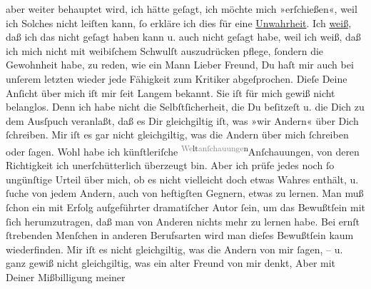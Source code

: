 \begin{ledgroupsized}[t]{13cm}
               aber weiter behauptet wird, ich hätte geſagt, ich möchte mich »erſchießen«, weil ich
               Solches nicht leiſten kann, ſo erkläre ich dies für eine \uline{Unwahrheit}. \strikeout{\textcolor{gray}{×}\-\textcolor{gray}{×}\-\textcolor{gray}{×}\-\textcolor{gray}{×}{ }\textcolor{gray}{Feſtſtellung dieſ}\textcolor{gray}{×}\-\textcolor{gray}{×}{ }\textcolor{gray}{×}\-\textcolor{gray}{×}\-\textcolor{gray}{×}\-\textcolor{gray}{×}\-\textcolor{gray}{×}\-\textcolor{gray}{×}\-\textcolor{gray}{×}} Ich \uline{weiß}, daß ich das nicht geſagt haben kann
               u. auch nicht geſagt habe, weil ich weiß, daß ich mich nicht mit weibiſchem Schwulſt
                  {\pb}auszudrücken pflege, ſondern die Gewohnheit
               habe, zu reden, wie ein Mann{\dotsseven}\pend
           \pstart
           Lieber Freund, Du haſt mir auch bei unſerem letzten \label{K_L03475-17v}\label{K_L03475-17h} wieder jede Fähigkeit zum Kritiker abgeſprochen. Dieſe Deine
               Anſicht über mich iſt mir ſeit Langem bekannt. Sie iſt für mich gewiß nicht
               belanglos. Denn ich habe nicht die Selbſtſicherheit, die Du beſitzeſt u. die Dich zu
               dem Ausſpuch veranlaßt, daß es {\pb}Dir gleichgiltig
               iſt, was  »wir Andern« über Dich ſchreiben. Mir
               iſt es gar nicht gleichgiltig, was die Andern über mich ſchreiben oder ſagen. Wohl
               habe ich künſtleriſche \substVorne{}\textsuperscript{\textcolor{gray}{We}lt\textcolor{gray}{anſchauunge}n}{\allowbreak}\substDazwischen{}Anſchauungen\substHinten{}, von deren Richtigkeit ich unerſchütterlich überzeugt bin. Aber ich prüfe
               jedes noch ſo ungünſtige Urteil über mich, ob es nicht vielleicht doch etwas Wahres
               enthält, u. ſuche von jedem Andern, auch von heftigſten Gegnern, etwas zu lernen. Man
               muß ſchon ein mit Erfolg aufgeführter dramatiſcher Autor ſein, {\pb}um das Bewußtſein mit ſich herumzutragen, daß
               man von Anderen nichts mehr zu lernen habe. Bei ernſt ſtrebenden Menſchen in anderen
               Berufsarten wird man dieſes Bewußtſein kaum wiederfinden.\pend
           \pstart
           Mir iſt es nicht gleichgiltig, was die Andern von mir ſagen, – u. ganz gewiß nicht
               gleichgiltig, was ein alter Freund von mir denkt, Aber mit Deiner Mißbilligung meiner

\end{ledgroupsized}
